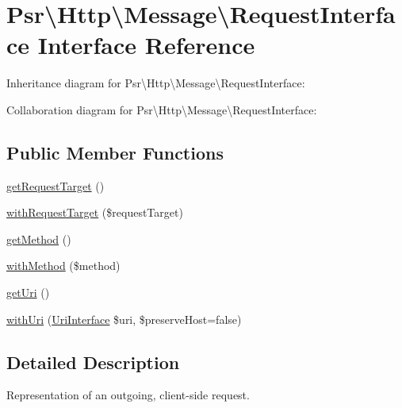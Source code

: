 \hypertarget{interfacePsr_1_1Http_1_1Message_1_1RequestInterface}{}\section{Psr\textbackslash{}Http\textbackslash{}Message\textbackslash{}Request\+Interface Interface Reference}
\label{interfacePsr_1_1Http_1_1Message_1_1RequestInterface}


Inheritance diagram for Psr\textbackslash{}Http\textbackslash{}Message\textbackslash{}Request\+Interface\+:


Collaboration diagram for Psr\textbackslash{}Http\textbackslash{}Message\textbackslash{}Request\+Interface\+:
\subsection*{Public Member Functions}
\begin{DoxyCompactItemize}
\item 
\hyperlink{interfacePsr_1_1Http_1_1Message_1_1RequestInterface_a4b9117fe12afd5c5555d3ae7d183ded2}{get\+Request\+Target} ()
\item 
\hyperlink{interfacePsr_1_1Http_1_1Message_1_1RequestInterface_a26d10ad91bf93238d7aa64d5469e06be}{with\+Request\+Target} (\$request\+Target)
\item 
\hyperlink{interfacePsr_1_1Http_1_1Message_1_1RequestInterface_a1aceab5bc5a2067500f4a80ac314fbc9}{get\+Method} ()
\item 
\hyperlink{interfacePsr_1_1Http_1_1Message_1_1RequestInterface_aa48dc3287b9848e0da3425973a60653e}{with\+Method} (\$method)
\item 
\hyperlink{interfacePsr_1_1Http_1_1Message_1_1RequestInterface_a179c55f570319eb0736f9a8209c9cac6}{get\+Uri} ()
\item 
\hyperlink{interfacePsr_1_1Http_1_1Message_1_1RequestInterface_a17c5215ee9c9cf32304834d9093d3291}{with\+Uri} (\hyperlink{interfacePsr_1_1Http_1_1Message_1_1UriInterface}{Uri\+Interface} \$uri, \$preserve\+Host=false)
\end{DoxyCompactItemize}


\subsection{Detailed Description}
Representation of an outgoing, client-\/side request.

